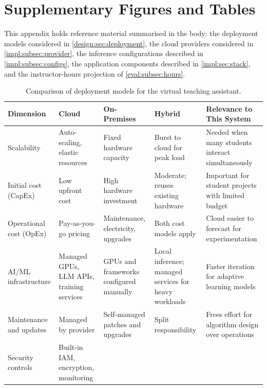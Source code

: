 \chapter{Supplementary Figures and Tables}
\label{append:comparisons}
\vspace*{2em}

This appendix holds reference material summarised in the body: the
deployment models considered in \autoref{design:sec:deployment}, the cloud
providers considered in \autoref{impl:subsec:provider}, the inference
configurations described in \autoref{impl:subsec:configs}, the application
components described in \autoref{impl:sec:stack}, and the instructor-hours
projection of \autoref{eval:subsec:hours}.

\begin{table}[htb]
  \centering
  \caption{Comparison of deployment models for the virtual teaching assistant.}
  \label{design:tab:deployment}
  \footnotesize
  \renewcommand{\arraystretch}{1.3}
  \begin{tabular}{L{0.13\textwidth} L{0.18\textwidth} L{0.18\textwidth} L{0.18\textwidth} L{0.185\textwidth}}
    \hline
    \textbf{Dimension} & \textbf{Cloud} & \textbf{On-Premises} & \textbf{Hybrid} & \textbf{Relevance to This System} \\
    \hline
    Scalability &
      Auto-scaling, elastic resources &
      Fixed hardware capacity &
      Burst to cloud for peak load &
      Needed when many students interact simultaneously \\
    Initial cost (CapEx) &
      Low upfront cost &
      High hardware investment &
      Moderate; reuses existing hardware &
      Important for student projects with limited budget \\
    Operational cost (OpEx) &
      Pay-as-you-go pricing &
      Maintenance, electricity, upgrades &
      Both cost models apply &
      Cloud easier to forecast for experimentation \\
    AI/ML infrastructure &
      Managed GPUs, LLM APIs, training services &
      GPUs and frameworks configured manually &
      Local inference; managed services for heavy workloads &
      Faster iteration for adaptive learning models \\
    Maintenance and updates &
      Managed by provider &
      Self-managed patches and upgrades &
      Split responsibility &
      Frees effort for algorithm design over operations \\
    Security controls &
      Built-in IAM, encryption, monitoring &

\end{tabular}
\end{table}
